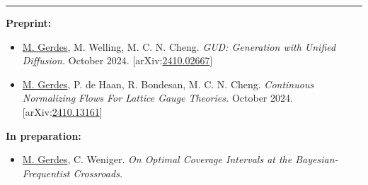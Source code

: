 \documentclass[12pt]{article}
\begin{document}
\vspace{15pt}
\hrule

\vspace{7pt}
\textbf{Preprint:}

\begin{itemize}[left=0pt, itemsep=5pt]
    \item \underline{M. Gerdes}, M. Welling, M. C. N. Cheng. \textit{GUD: Generation with Unified Diffusion.} October 2024.
    [arXiv:\href{https://arxiv.org/abs/2410.02667}{2410.02667}]
\end{itemize}

\begin{itemize}[left=0pt, itemsep=5pt]
    \item \underline{M. Gerdes}, P. de Haan, R. Bondesan, M. C. N. Cheng. \textit{Continuous Normalizing Flows For Lattice Gauge Theories.} October 2024. [arXiv:\href{https://arxiv.org/abs/2410.13161}{2410.13161}]
\end{itemize}

\vspace{7pt}
\textbf{In preparation:}

\begin{itemize}[left=0pt, itemsep=5pt]
    \item \underline{M. Gerdes}, C. Weniger. \textit{On Optimal Coverage Intervals at the Bayesian-Frequentist Crossroads.}
\end{itemize}
\end{document}
